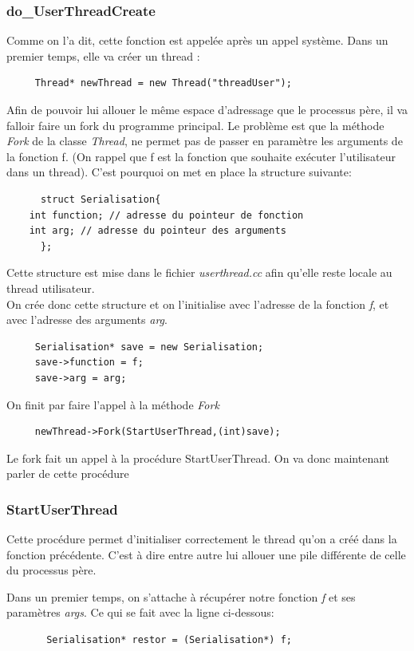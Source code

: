 \documentclass[a4paper,10pt]{report}
\begin{document}
    \textcolor{TealBlue}{\subsubsection*{do\_UserThreadCreate}}
      Comme on l'a dit, cette fonction est appelée après un appel système. Dans un premier temps, elle va créer un thread :
	\begin{lstlisting}
	 Thread* newThread = new Thread("threadUser");
	\end{lstlisting}
     Afin de pouvoir lui allouer le même espace d'adressage que le processus père, il va falloir faire un fork du programme principal.
     Le problème est que la méthode \emph{Fork} de la classe \emph{Thread}, ne permet pas de passer en paramètre les arguments de la fonction f.
     (On rappel que f est la fonction que souhaite exécuter l'utilisateur dans un thread). C'est pourquoi on met en place la structure suivante:
     \begin{lstlisting}
      struct Serialisation{
	int function; // adresse du pointeur de fonction
	int arg; // adresse du pointeur des arguments
      };
     \end{lstlisting}
    Cette structure est mise dans le fichier \emph{userthread.cc} afin qu'elle reste locale au thread utilisateur.\\

    On crée donc cette structure et on l'initialise avec l'adresse de la fonction \emph{f}, et avec l'adresse des arguments \emph{arg}.
    \begin{lstlisting}
     Serialisation* save = new Serialisation;
     save->function = f;
     save->arg = arg;
    \end{lstlisting}
    On finit par faire l'appel à la méthode \emph{Fork}
    \begin{lstlisting}
     newThread->Fork(StartUserThread,(int)save);
    \end{lstlisting}
    Le fork fait un appel à la procédure StartUserThread. On va donc maintenant parler de cette procédure
    \newpage
    \textcolor{TealBlue}{\subsubsection*{StartUserThread}}
      Cette procédure permet d'initialiser correctement le thread qu'on a créé dans la fonction précédente. C'est à dire entre autre lui allouer une pile différente de
      celle du processus père.
      
      Dans un premier temps, on s'attache à récupérer notre fonction \emph{f} et ses paramètres \emph{args}. Ce qui se fait avec la ligne ci-dessous:
      \begin{lstlisting}
       Serialisation* restor = (Serialisation*) f;
      \end{lstlisting}
      
\end{document}
